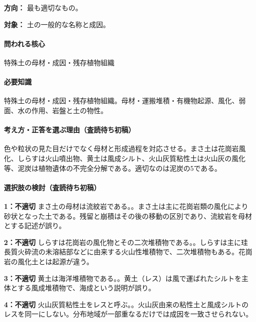 \noindent\textbf{方向：} 最も適切なもの。\par

\noindent\textbf{対象：} 土の一般的な名称と成因。\par

\paragraph{問われる核心} 特殊土の母材・成因・残存植物組織

\paragraph{必要知識} 特殊土の母材・成因・残存植物組織。母材・運搬堆積・有機物起源、風化、弱面、水の作用、岩盤と土の物性。

\paragraph{考え方・正答を選ぶ理由（査読待ち初稿）} 色や粒状の見た目だけでなく母材と形成過程を対応させる。まさ土は花崗岩風化、しらすは火山噴出物、黄土は風成シルト、火山灰質粘性土は火山灰の風化等、泥炭は植物遺体の不完全分解である。適切なのは泥炭の5である。

\paragraph{選択肢の検討（査読待ち初稿）}\mbox{}\par

\noindent\textbf{1：不適切} まさ土の母材は流紋岩である。。まさ土は主に花崗岩類の風化により砂状となった土である。残留と崩積はその後の移動の区別であり、流紋岩を母材とする記述が誤り。\par

\noindent\textbf{2：不適切} しらすは花崗岩の風化物とその二次堆積物である。。しらすは主に珪長質火砕流の未溶結部などに由来する火山性堆積物で、二次堆積物もある。花崗岩の風化土とは起源が違う。\par

\noindent\textbf{3：不適切} 黄土は海洋堆積物である。。黄土（レス）は風で運ばれたシルトを主体とする風成堆積物で、海成という説明が誤り。\par

\noindent\textbf{4：不適切} 火山灰質粘性土をレスと呼ぶ。。火山灰由来の粘性土と風成シルトのレスを同一にしない。分布地域が一部重なるだけでは成因を一致させられない。\par

